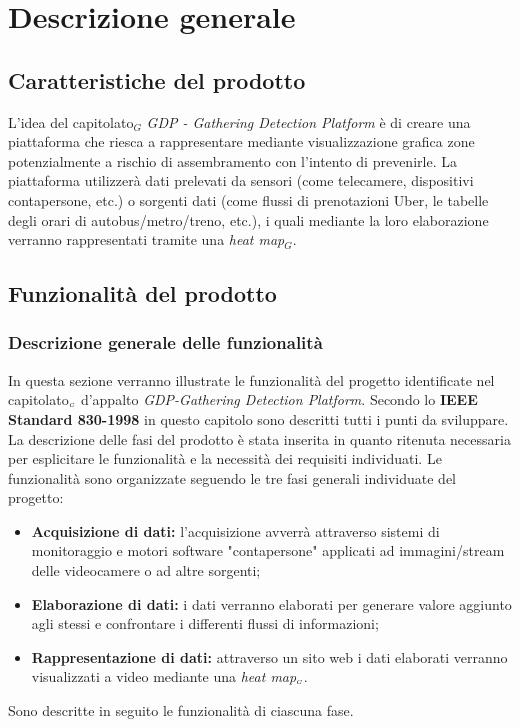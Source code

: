 \chapter{Descrizione generale}\label{descrizioneGenerale}
\section{Caratteristiche del prodotto}\label{descrizioneGeneraleCaratteristicheProdotto}
L'idea del capitolato$_G$ \textit{GDP - Gathering Detection Platform} è di creare una piattaforma che riesca a rappresentare mediante visualizzazione grafica zone potenzialmente a rischio di assembramento con l'intento di prevenirle.
La piattaforma utilizzerà dati prelevati da sensori (come telecamere, dispositivi contapersone, etc.) o sorgenti dati (come flussi di prenotazioni Uber, le tabelle degli orari di autobus/metro/treno, etc.), i quali mediante la loro elaborazione verranno rappresentati tramite una \textit{heat map$_G$}.

\section{Funzionalità del prodotto}\label{descrizioneFunzionalitàDelProdotto}
\subsection{Descrizione generale delle funzionalità}\label{}
In questa sezione verranno illustrate le funzionalità del progetto identificate nel capitolato$_{\scaleto{G}{3pt}}$ d'appalto \textit{GDP-Gathering Detection Platform}.  Secondo lo \textbf{IEEE Standard 830-1998} in questo capitolo sono descritti tutti i punti da sviluppare. La descrizione delle fasi del prodotto è stata inserita in quanto ritenuta necessaria per esplicitare le funzionalità e la necessità dei requisiti individuati. %
Le funzionalità sono organizzate seguendo le tre fasi generali individuate del progetto:
\begin{itemize}
	\item \textbf{Acquisizione di dati:} l'acquisizione avverrà attraverso sistemi di monitoraggio e motori software "contapersone" applicati ad immagini/stream delle videocamere o ad altre sorgenti;
	\item \textbf{Elaborazione di dati:} i dati verranno elaborati per generare valore aggiunto agli stessi e confrontare i differenti flussi di informazioni;
	\item \textbf{Rappresentazione di dati:} attraverso un sito web i dati elaborati verranno visualizzati a video mediante una \textit{heat map$_{\scaleto{G}{3pt}}$}.
\end{itemize}
Sono descritte in seguito le funzionalità di ciascuna fase.

